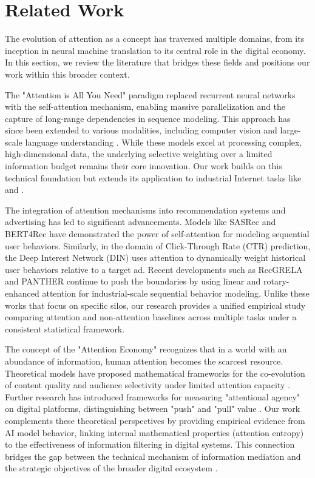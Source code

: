 \section{Related Work}
\label{sec:related_work}

The evolution of attention as a concept has traversed multiple domains, from its inception in neural machine translation to its central role in the digital economy. In this section, we review the literature that bridges these fields and positions our work within this broader context.

The "Attention is All You Need" paradigm \cite{vaswani2017attention} replaced recurrent neural networks with the self-attention mechanism, enabling massive parallelization and the capture of long-range dependencies in sequence modeling. This approach has since been extended to various modalities, including computer vision \cite{rombach2022high} and large-scale language understanding \cite{devlin2018bert}. While these models excel at processing complex, high-dimensional data, the underlying selective weighting over a limited information budget remains their core innovation. Our work builds on this technical foundation but extends its application to industrial Internet tasks like \sectask and \ctrtask.

The integration of attention mechanisms into recommendation systems and advertising has led to significant advancements. Models like SASRec \cite{kang2018self} and BERT4Rec \cite{sun2019bert4rec} have demonstrated the power of self-attention for modeling sequential user behaviors. Similarly, in the domain of Click-Through Rate (CTR) prediction, the Deep Interest Network (DIN) \cite{zhou2018deep} uses attention to dynamically weight historical user behaviors relative to a target ad. Recent developments such as RecGRELA \cite{hu2025gated} and PANTHER \cite{panther2025panther} continue to push the boundaries by using linear and rotary-enhanced attention for industrial-scale sequential behavior modeling. Unlike these works that focus on specific silos, our research provides a unified empirical study comparing attention and non-attention baselines across multiple tasks under a consistent statistical framework.

The concept of the "Attention Economy" recognizes that in a world with an abundance of information, human attention becomes the scarcest resource. Theoretical models have proposed mathematical frameworks for the co-evolution of content quality and audience selectivity under limited attention capacity \cite{chujyo2026attention}. Further research has introduced frameworks for measuring "attentional agency" on digital platforms, distinguishing between "push" and "pull" value \cite{wojtowicz2024push}. Our work complements these theoretical perspectives by providing empirical evidence from AI model behavior, linking internal mathematical properties (attention entropy) to the effectiveness of information filtering in digital systems. This connection bridges the gap between the technical mechanism of information mediation and the strategic objectives of the broader digital ecosystem \cite{castaldo2022online}.
